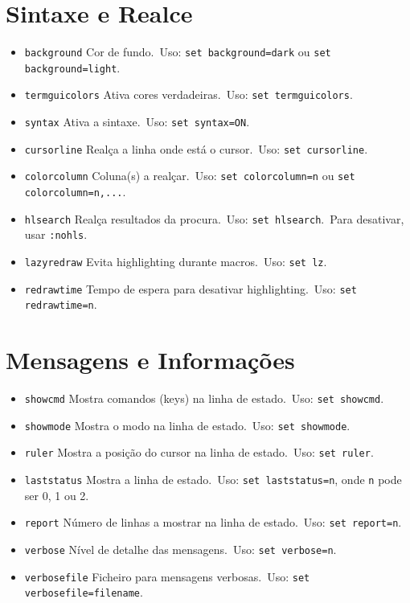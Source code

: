 \section{Sintaxe e Realce}

\begin{itemize}
    \item \texttt{background} Cor de fundo.\ Uso: \texttt{set background=dark} ou \texttt{set background=light}.
    \item \texttt{termguicolors} Ativa cores verdadeiras.\ Uso: \texttt{set termguicolors}.
    \item \texttt{syntax} Ativa a sintaxe.\ Uso: \texttt{set syntax=ON}.
    \item \texttt{cursorline} Realça a linha onde está o cursor.\ Uso: \texttt{set cursorline}.
    \item \texttt{colorcolumn} Coluna(s) a realçar.\ Uso: \texttt{set colorcolumn=n} ou \texttt{set colorcolumn=n,...}.
    \item \texttt{hlsearch} Realça resultados da procura.\ Uso: \texttt{set hlsearch}.\ Para desativar, usar \texttt{:nohls}.
    \item \texttt{lazyredraw} Evita highlighting durante macros.\ Uso: \texttt{set lz}.
    \item \texttt{redrawtime} Tempo de espera para desativar highlighting.\ Uso: \texttt{set redrawtime=n}.
\end{itemize}

\section{Mensagens e Informações}

\begin{itemize}
    \item \texttt{showcmd} Mostra comandos (keys) na linha de estado.\ Uso: \texttt{set showcmd}.
    \item \texttt{showmode} Mostra o modo na linha de estado.\ Uso: \texttt{set showmode}.
    \item \texttt{ruler} Mostra a posição do cursor na linha de estado.\ Uso: \texttt{set ruler}.
    \item \texttt{laststatus} Mostra a linha de estado.\ Uso: \texttt{set laststatus=n}, onde \texttt{n} pode ser 0, 1 ou 2.
    \item \texttt{report} Número de linhas a mostrar na linha de estado.\ Uso: \texttt{set report=n}.
    \item \texttt{verbose} Nível de detalhe das mensagens.\ Uso: \texttt{set verbose=n}.
    \item \texttt{verbosefile} Ficheiro para mensagens verbosas.\ Uso: \texttt{set verbosefile=filename}.
\end{itemize}

